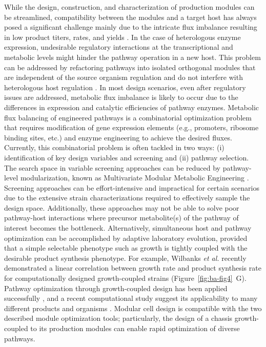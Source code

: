 While the design, construction, and characterization of production modules can be streamlined, compatibility between the modules and a target host has always posed a significant challenge mainly due to the intricate flux imbalance resulting in low product titers, rates, and yields \citep{nielsen2016b}.
In the case of heterologous enzyme expression, undesirable regulatory interactions at the transcriptional and metabolic levels might hinder the pathway operation in a new host.
This problem can be addressed by refactoring pathways into isolated orthogonal modules that are independent of the source organism regulation and do not interfere with heterologous host regulation \citep{galanie2015, RN171, tan2017, temme2012}.
In most design scenarios, even after regulatory issues are addressed, metabolic flux imbalance is likely to occur due to the differences in expression and catalytic efficiencies of pathway enzymes.
Metabolic flux balancing of engineered pathways is a combinatorial optimization problem that requires modification of gene expression elements (e.g., promoters, ribosome binding sites, etc.) and enzyme engineering to achieve the desired fluxes.
Currently, this combinatorial problem is often tackled in two ways: (i) identification of key design variables and screening and (ii) pathway selection.
The search space in variable screening approaches can be reduced by pathway-level modularization, known as Multivariate Modular Metabolic Engineering \citep{biggs2014, jeschek2017, yadav2012}.
Screening approaches can be effort-intensive and impractical for certain scenarios due to the extensive strain characterizations required to effectively sample the design space.
Additionally, these approaches may not be able to solve poor pathway-host interactions where precursor metabolite(s) of the pathway of interest becomes the bottleneck.
Alternatively, simultaneous host and pathway optimization can be accomplished by adaptive laboratory evolution, provided that a simple selectable phenotype such as growth is tightly coupled with the desirable product synthesis phenotype.
For example, Wilbanks \emph{et al.} \citep{wilbanks2017} recently demonstrated a linear correlation between growth rate and product synthesis rate for computationally designed growth-coupled strains \citep{trinh2015} (Figure~\ref{fig:ba-fig4}~G).
Pathway optimization through growth-coupled design has been applied successfully \citep{fong2005}, and a recent computational study suggest its applicability to many different products and organisms \citep{von2017}.
Modular cell design is compatible with the two described module optimization tools; particularly, the design of a chassis growth-coupled to its production modules can enable rapid optimization of diverse pathways.

